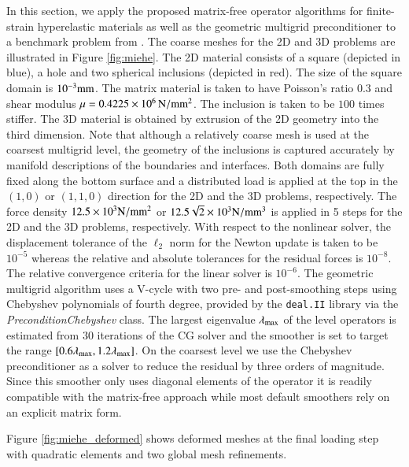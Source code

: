\documentclass[times,doublespace]{nmeauth}
\begin{document}
In this section, we apply the proposed matrix-free operator algorithms for finite-strain hyperelastic materials as well as the geometric multigrid preconditioner to a benchmark problem from \cite{Miehe2007}. The coarse meshes for the 2D and 3D problems are illustrated in Figure \ref{fig:miehe}. The 2D material consists of a square (depicted in blue), a hole and two spherical inclusions (depicted in red). The size of the square domain is $10^{-3} \rm{mm}$.
The matrix material is taken to have Poisson's ratio $0.3$ and shear modulus $\mu=0.4225 \times 10^6\, \rm{N/mm^2}$. The inclusion is taken to be $100$ times stiffer.
The 3D material is obtained by extrusion of the 2D geometry into the third dimension.
Note that although a relatively coarse mesh is used at the coarsest multigrid level, the geometry of the inclusions is captured accurately by manifold descriptions of the boundaries and interfaces.
Both domains are fully fixed along the bottom surface and a distributed load is applied at the top in the $(1,0)$ or $(1,1,0)$ direction for the 2D and the 3D problems, respectively.
The force density $12.5 \times 10^3 \rm{N/mm^2}$ or $12.5 \sqrt{2} \times 10^3 \rm{N/mm^3}$ is applied in 5 steps for the 2D and the 3D problems, respectively.
With respect to the nonlinear solver, the displacement tolerance of the $\mathcal{\ell}_2$ norm for the Newton update is taken to be $10^{-5}$ whereas the relative and absolute tolerances for the residual forces is $10^{-8}$. The relative convergence criteria for the linear solver is $10^{-6}$.
{\color{red}
The geometric multigrid algorithm uses a V-cycle with two pre- and post-smoothing steps using Chebyshev polynomials \cite{Varga2009} of fourth degree, provided
by the \texttt{deal.II} library via the \textit{PreconditionChebyshev} class.
The largest eigenvalue $\lambda_{\rm{max}}$ of the level operators is estimated from $30$ iterations of the CG solver and the smoother
is set to target the range $[0.6\lambda_{\rm{max}}, 1.2\lambda_{\rm{max}}]$.
On the coarsest level we use {\color{red}the Chebyshev preconditioner as a solver \cite{Varga2009}} to reduce the residual by three orders of magnitude.
Since this smoother only uses diagonal elements of the operator it is readily compatible with the matrix-free approach while most default smoothers rely on an explicit matrix form.}

Figure \ref{fig:miehe_deformed} shows deformed meshes at the final loading step with quadratic elements and two global mesh refinements.
\end{document}
